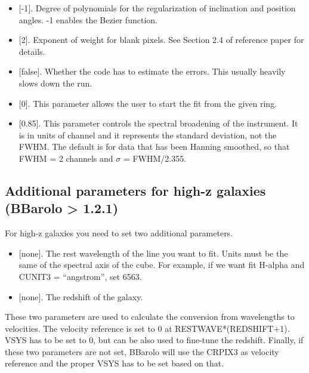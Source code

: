 \documentclass[letterpaper,10pt,english]{sphinxmanual}
\begin{document}
\begin{itemize}
\item {} 
 {[}-1{]}. Degree of polynomials for the regularization of inclination and position angles. -1 enables the Bezier function.

\item {} 
 {[}2{]}. Exponent of weight for blank pixels. See Section 2.4 of reference paper for details.

\item {} 
 {[}false{]}. Whether the code has to estimate the errors. This usually heavily slows down the run.

\item {} 
 {[}0{]}. This parameter allows the user to start the fit from the given ring.

\item {} 
 {[}0.85{]}. This parameter controls the spectral broadening of the instrument. It is in units of channel and it represents the standard deviation, not the FWHM. The default is for data that has been Hanning smoothed, so that FWHM = 2 channels and \(\sigma\) = FWHM/2.355.

\end{itemize}


\subsection{Additional parameters for high-z galaxies (BBarolo \textgreater{} 1.2.1)}
\label{\detokenize{tasks:additional-parameters-for-high-z-galaxies-bbarolo-1-2-1}}
For high-z galaxies you need to set two additional parameters.
\begin{itemize}
\item {} 
 {[}none{]}. The rest wavelength of the line you want to fit. Units must be the same of the spectral axis of the cube. For example, if we want fit H-alpha and CUNIT3 = “angstrom”, set 6563.

\item {} 
 {[}none{]}. The redshift of the galaxy.

\end{itemize}

These two parameters are used to calculate the conversion from wavelengths to velocities. The velocity reference is set to 0 at RESTWAVE*(REDSHIFT+1). VSYS has to be set to 0, but can be also used to fine-tune the redshift. Finally, if these two parameters are not set, BBarolo will use the CRPIX3 as velocity reference and the proper VSYS has to be set based on that.
\end{document}
